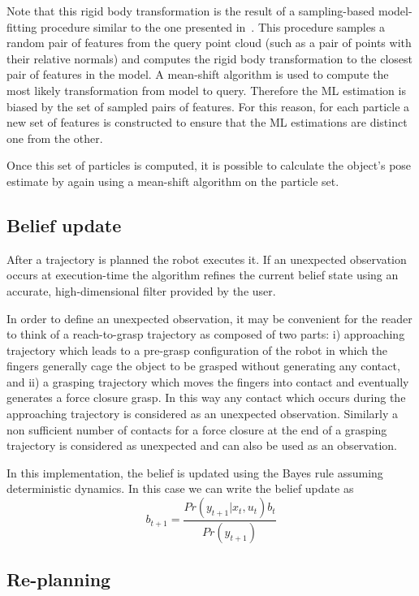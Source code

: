 Note that this rigid body transformation is the result of a sampling-based model-fitting procedure similar to the one presented in~\citep{bib:uli_cviu_2011}. This procedure samples a random pair of features from the query point cloud (such as a pair of points with their relative normals) and computes the rigid body transformation to the closest pair of features in the model. A mean-shift algorithm is used to compute the most likely transformation from model to query. Therefore the ML estimation is biased by the set of sampled pairs of features. For this reason, for each particle a new set of features is constructed to ensure that the ML estimations are distinct one from the other.

Once this set of particles is computed, it is possible to calculate the object's pose estimate by again using a mean-shift algorithm on the particle set. 

\subsection{Belief update}

After a trajectory is planned the robot executes it. If an unexpected observation occurs at execution-time the algorithm refines the current belief state using an accurate, high-dimensional filter provided by the user.

In order to define an unexpected observation, it may be convenient for the reader to think of a reach-to-grasp trajectory as composed of two parts: i) approaching trajectory which leads to a pre-grasp configuration of the robot in which the fingers generally cage the object to be grasped without generating any contact, and ii) a grasping trajectory which moves the fingers into contact and eventually generates a force closure grasp. In this way any contact which occurs during the approaching trajectory is considered as an unexpected observation. Similarly a non sufficient number of contacts for a force closure at the end of a grasping trajectory is considered as unexpected and can also be used as an observation.

In this implementation, the belief is updated using the Bayes rule assuming deterministic dynamics. In this case we can write the belief update as
\begin{equation}\label{eq:belief_update}
b_{t+1} = \frac{Pr(y_{t+1}|x_{t},u_{t})b_{t}}{Pr(y_{t+1})}
\end{equation} 

\subsection{Re-planning}


